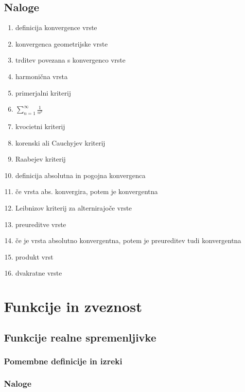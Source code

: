 \documentclass[a4paper,12pt]{report}
\begin{document}
\pagebreak

\section*{Naloge}

\begin{enumerate}
    \item definicija konvergence vrste
    \item konvergenca geometrijske vrste
    \item trditev povezana s konvergenco vrste
    \item harmonična vrsta
    \item primerjalni kriterij
    \item $ \sum_{n=1}^{\infty} \frac{1}{n^p} $
    \item kvocietni kriterij
    \item korenski ali Cauchyjev kriterij
    \item Raabejev kriterij
    \item definicija absolutna in pogojna konvergenca
    \item če vrsta abs. konvergira, potem je konvergentna
    \item Leibnizov kriterij za alternirajoče vrste
    \item preureditve vrste
    \item če je vrsta absolutno konvergentna, potem je preureditev tudi konvergentna
    \item produkt vrst
    \item dvakratne vrste
\end{enumerate}

\chapter{Funkcije in zveznost}

\section*{Funkcije realne spremenljivke}

\subsection*{Pomembne definicije in izreki}



\subsection*{Naloge}
\end{document}
